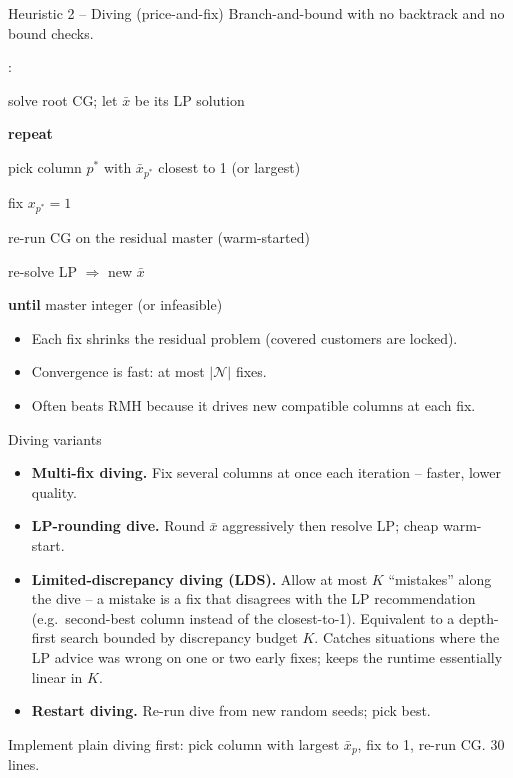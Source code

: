 \documentclass[10pt,aspectratio=169]{beamer}
\newcounter{algoline}
\newenvironment{algo}[1][Algorithm]{%
  \setcounter{algoline}{0}%
  \begin{tcolorbox}[colback=soft,colframe=accent2!70,sharp corners,
      boxrule=0.4pt,left=4pt,right=4pt,top=2pt,bottom=2pt,
      title=\textbf{#1}]%
  \ttfamily\small
  \begin{list}{\stepcounter{algoline}\textcolor{accent2}{\scriptsize\arabic{algoline}:}}%
    {\setlength{\leftmargin}{2.0em}\setlength{\itemsep}{0.1em}\setlength{\topsep}{0pt}}%
}{%
  \end{list}\end{tcolorbox}%
}
\newcommand{\Indent}{\hspace*{1.2em}}
\begin{document}
\begin{frame}{Heuristic 2 -- Diving (price-and-fix)}
  Branch-and-bound with no backtrack and no bound checks.

  \medskip
  \begin{algo}[Diving heuristic]
  \item solve root CG; let $\bar x$ be its LP solution
  \item \textbf{repeat}
  \item \Indent pick column $p^*$ with $\bar x_{p^*}$ closest to 1 (or largest)
  \item \Indent fix $x_{p^*}\!=\!1$
  \item \Indent re-run CG on the residual master (warm-started)
  \item \Indent re-solve LP $\Rightarrow$ new $\bar x$
  \item \textbf{until} master integer (or infeasible)
  \end{algo}
  \begin{itemize}\small
    \item Each fix shrinks the residual problem (covered customers are
          locked).
    \item Convergence is fast: at most $|\mathcal N|$ fixes.
    \item Often beats RMH because it drives \alert{new compatible columns}
          at each fix.
  \end{itemize}
\end{frame}

\begin{frame}{Diving variants}
  \begin{itemize}\small
    \item \textbf{Multi-fix diving.} Fix several columns at once each
          iteration -- faster, lower quality.
    \item \textbf{LP-rounding dive.} Round $\bar x$ aggressively then resolve
          LP; cheap warm-start.
    \item \textbf{Limited-discrepancy diving (LDS).} Allow at most $K$
          ``mistakes'' along the dive -- a mistake is a fix that disagrees
          with the LP recommendation (e.g.\ second-best column instead of
          the closest-to-1). Equivalent to a depth-first search bounded by
          discrepancy budget $K$. Catches situations where the LP advice was
          wrong on one or two early fixes; keeps the runtime essentially
          linear in $K$.
    \item \textbf{Restart diving.} Re-run dive from new random seeds; pick best.
  \end{itemize}

  \medskip
  \begin{keybox}
    Implement plain diving first: pick column with largest $\bar x_p$, fix to
    1, re-run CG. 30 lines.
  \end{keybox}
\end{frame}
\end{document}

